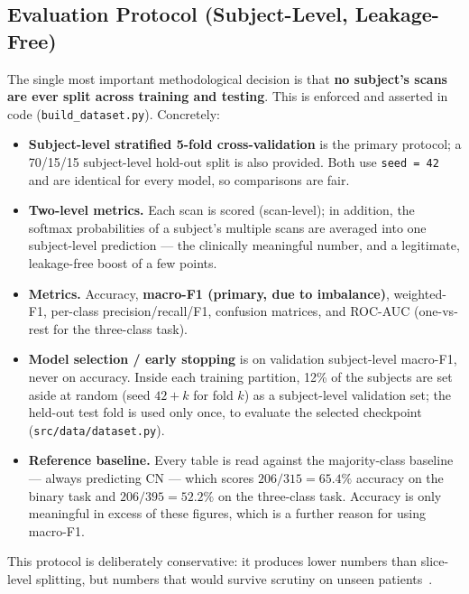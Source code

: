 \subsection{Evaluation Protocol (Subject-Level, Leakage-Free)}
The single most important methodological decision is that \textbf{no subject's scans are ever split across training and testing}. This is enforced and asserted in code (\texttt{build\_dataset.py}). Concretely:
\begin{itemize}
    \item \textbf{Subject-level stratified 5-fold cross-validation} is the primary protocol; a 70/15/15 subject-level hold-out split is also provided. Both use \texttt{seed = 42} and are identical for every model, so comparisons are fair.
    \item \textbf{Two-level metrics.} Each scan is scored (scan-level); in addition, the softmax probabilities of a subject's multiple scans are averaged into one subject-level prediction --- the clinically meaningful number, and a legitimate, leakage-free boost of a few points.
    \item \textbf{Metrics.} Accuracy, \textbf{macro-F1 (primary, due to imbalance)}, weighted-F1, per-class precision/recall/F1, confusion matrices, and ROC-AUC (one-vs-rest for the three-class task).
    \item \textbf{Model selection / early stopping} is on validation subject-level macro-F1, never on accuracy. Inside each training partition, 12\% of the subjects are set aside at random (seed $42+k$ for fold $k$) as a subject-level validation set; the held-out test fold is used only once, to evaluate the selected checkpoint (\texttt{src/data/dataset.py}).
    \item \textbf{Reference baseline.} Every table is read against the majority-class baseline --- always predicting CN --- which scores $206/315 = 65.4\%$ accuracy on the binary task and $206/395 = 52.2\%$ on the three-class task. Accuracy is only meaningful in excess of these figures, which is a further reason for using macro-F1.
\end{itemize}
This protocol is deliberately conservative: it produces lower numbers than slice-level splitting, but numbers that would survive scrutiny on unseen patients~\cite{wen2020convolutional,yagis2021effect}.

